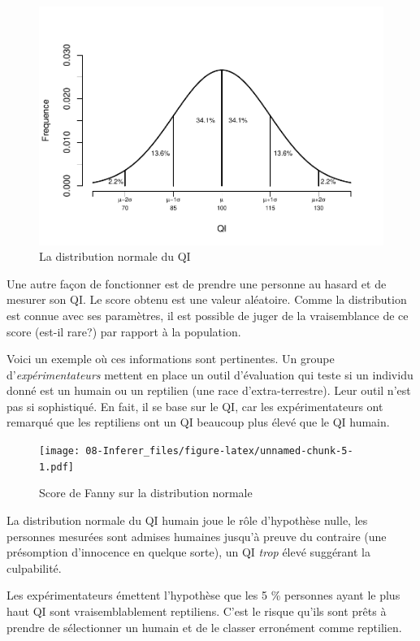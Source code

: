 \documentclass[
]{book}
\begin{document}
\begin{figure}

{\centering \includegraphics[width=0.9\linewidth,height=0.9\textheight]{08-Inferer_files/figure-latex/regle-1} 

}

\caption{La distribution normale du QI}\label{fig:regle}
\end{figure}

Une autre façon de fonctionner est de prendre une personne au hasard et de mesurer son QI. Le score obtenu est une valeur aléatoire. Comme la distribution est connue avec ses paramètres, il est possible de juger de la vraisemblance de ce score (est-il rare?) par rapport à la population.

Voici un exemple où ces informations sont pertinentes. Un groupe d'\emph{expérimentateurs} mettent en place un outil d'évaluation qui teste si un individu donné est un humain ou un reptilien (une race d'extra-terrestre). Leur outil n'est pas si sophistiqué. En fait, il se base sur le QI, car les expérimentateurs ont remarqué que les reptiliens ont un QI beaucoup plus élevé que le QI humain.

\begin{figure}
\centering
\texttt{[image: 08-Inferer\_files/figure-latex/unnamed-chunk-5-1.pdf]}
\caption{\label{fig:unnamed-chunk-5}Score de Fanny sur la distribution normale}
\end{figure}

La distribution normale du QI humain joue le rôle d'hypothèse nulle, les personnes mesurées sont admises humaines jusqu'à preuve du contraire (une présomption d'innocence en quelque sorte), un QI \emph{trop} élevé suggérant la culpabilité.

Les expérimentateurs émettent l'hypothèse que les 5 \% personnes ayant le plus haut QI sont vraisemblablement reptiliens. C'est le risque qu'ils sont prêts à prendre de sélectionner un humain et de le classer erronément comme reptilien.
\end{document}
